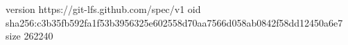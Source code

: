 version https://git-lfs.github.com/spec/v1
oid sha256:c3b35fb592fa1f53b3956325e602558d70aa7566d058ab0842f58dd12450a6e7
size 262240
